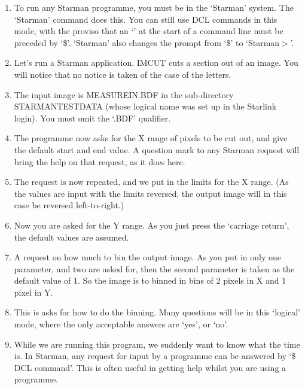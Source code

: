 \begin{enumerate} 

\item To run any Starman programme, you must be in the `Starman' system.
The `Starman' command does this.  You can still use {\small DCL} commands
in this mode, with the proviso that an `\@' at the start of a command line
must be preceded by `\$'. `Starman' also changes the prompt from `\$' to
`Starman$>$'. 

\item Let's run a Starman application.  IMCUT cuts a section out of an
image. You will notice that no notice is taken of the case of the letters. 

\item The input image is MEASURE{\undersc}IN.BDF in the sub-directory 
STARMAN{\undersc}TESTDATA (whose logical name was set up in the Starlink login).
You must omit the `.BDF' qualifier.

\item The programme now asks for the X range of pixels to be cut out,
and give the default start and end value. A question mark to any
Starman request will bring the help on that request, as it does here.

\item The request is now repeated, and we put in the limits for the
X range. (As the values are input with the limits reversed, the output
image will in this case be reversed left-to-right.)

\item Now you are asked for the Y range. As you just press the `carriage
return', the default values are assumed.

\item A request on how much to bin the output image. As you put in only
one parameter, and two are asked for, then the second parameter is
taken as the default value of 1. So the image is to binned in bins of
2 pixels in X and 1 pixel in Y.

\item This is asks for how to do the binning. Many questions will be
in this `logical' mode, where the only acceptable answers are `yes',
or `no'.

\item While we are running this program, we suddenly want to know what
the time is. In Starman, any request for input by a programme can be
answered by `\$ {\small DCL} command'. This is often useful in getting
help whilst you are using a programme.


\end{enumerate}
